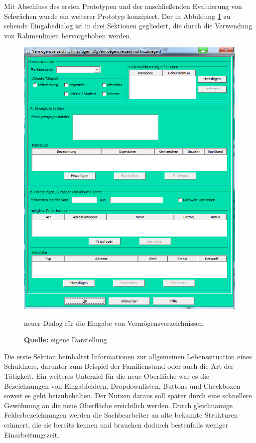 Mit Abschluss des ersten Prototypen und der anschließenden Evaluierung von Schwächen wurde ein weiterer Prototyp konzipiert. Der in Abbildung \ref{fig:neuerDialog} zu sehende Eingabedialog ist in drei Sektionen gegliedert, die durch die Verwendung von Rahmenlinien hervorgehoben werden. 
\begin{figure}[H]
  \centering
  \includegraphics[scale=0.85]{img/neuer_Dialog.PNG}
  \caption{neuer Dialog für die Eingabe von Vermögensverzeichnissen.}
    \caption*{\textbf{Quelle:} eigene Darstellung}
  \label{fig:neuerDialog}
\end{figure}
Die erste Sektion beinhaltet Informationen zur allgemeinen Lebenssituation eines Schuldners, darunter zum Beispiel der Familienstand oder auch die Art der Tätigkeit. Ein weiteres Unterziel für die neue Oberfläche war es die Bezeichnungen von Eingabfeldern, Dropdownlisten, Buttons und Checkboxen soweit es geht beizubehalten. Der Nutzen daraus soll später durch eine schnellere Gewöhnung an die neue Oberfläche ersichtlich werden. Durch gleichnamige Felderbezeichnungen werden die Sachbearbeiter an alte bekannte Strukturen erinnert, die sie bereits kennen und brauchen dadurch bestenfalls weniger Einarbeitungszeit.

